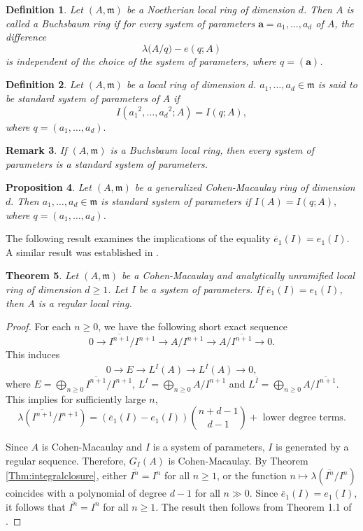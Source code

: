 \documentclass[11pt]{amsart}
\theoremstyle{plain}
\newtheorem{theorem}{Theorem}[section]
\newtheorem{proposition}[theorem]{Proposition}
\newtheorem{remark}[theorem]{Remark}
\newtheorem{definition}[theorem]{Definition}
\newcommand{\m}{\mathfrak{m}}
\theoremstyle{plain}
\begin{document}
\begin{definition}
\normalfont
    Let $(A, \mathfrak{m})$ be a Noetherian local ring of dimension $d$. Then $A$ is called a \emph{Buchsbaum ring} if for every system of parameters $\mathbf{a} = a_1, \dots, a_d$ of $A$, the difference
\[
\lambda\big(A/{q}\big) - e(q; A)
\]
is independent of the choice of the system of parameters, where $q=(\mathbf{a})$.
\end{definition}
\begin{definition}\label{def}
    \normalfont
    Let $(A,\m)$ be a local ring of dimension $d.$ $a_1,\ldots ,a_d \in \m$ is said to be standard system of parameters of $A$ if $$I({a_1}^2,\ldots ,{a_d}^2 ; A)=I(q; A),$$ where $q=(a_1,\ldots ,a_d).$
\end{definition}

\begin{remark}\cite[Page 13]{NVT}
    If $(A,\m)$ is a Buchsbaum local ring, then every system of parameters is a standard system of parameters.
\end{remark}
\begin{proposition}\cite[Theorem 2.1]{NVT}
    Let $(A,\m)$ be a generalized Cohen-Macaulay ring of dimension $d.$ Then $a_1,
    \ldots ,a_d\in \m$ is standard system of parameters if $I(A)=I(q ; A),$ where $q=(a_1,\dots, a_d)$.
\end{proposition}

The following result examines the implications of the equality $\overline{e}_1(I)=e_1(I).$ A similar result was established in \cite[Theorem 1]{nvte1}.
\begin{theorem}
\label{Areg}
   Let $(A,\m)$ be a Cohen-Macaulay and analytically unramified local ring of dimension $d\geq 1$. Let $I$ be a system of parameters. If $\overline{e}_1(I)=e_1(I)$, then $A$ is a regular local ring.
\end{theorem}
\begin{proof}
For each $n\geq 0$, we have the following short exact sequence $$0\to \overline{I^{n+1}}/I^{n+1} \to A/I^{n+1}\to A/\overline{I^{n+1}}\to 0.$$  This induces $$0\to E  \to L^I(A)\to L^{\overline{I}}(A)\to 0,$$ where $E=\bigoplus_{n\geq 0}\overline{I^{n+1}}/I^{n+1}$, $L^I=\bigoplus_{n\geq 0}A/I^{n+1}$ and $L^{\overline{I}}=\bigoplus_{n\geq 0}A/\overline{I^{n+1}}.$ This implies for sufficiently large  $n$, $$\lambda(\overline{I^{n+1}}/I^{n+1})=(\overline{e}_1({I})- e_1(I))\binom{n+d-1}{d-1}+\text{ lower degree terms}.$$


Since $A$ is Cohen-Macaulay and $I$ is a system of parameters, $I$ is generated by a regular sequence. Therefore, $G_I(A)$ is Cohen-Macaulay. By Theorem \ref{Thm:integralclosure}, either $\overline{I^n}=I^n$ for all $n\geq 1$, or the function $n \mapsto \lambda(\overline{I^n}/I^n)$ coincides with a polynomial of degree $d-1$ for all $n\gg0$. Since $\overline{e}_1(I)=e_1(I)$, it follows that  $\overline{I^n}=I^n$ for all $n\geq 1$. The result then follows from Theorem 1.1 of \cite{Goto}.
\end{proof}
\end{document}
